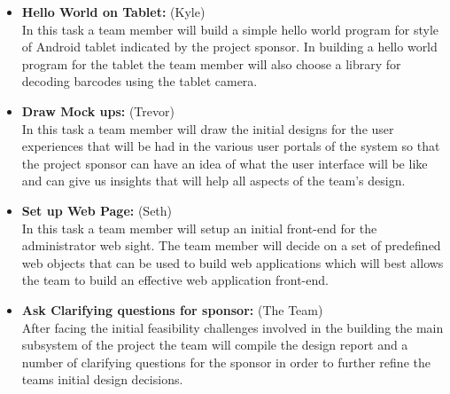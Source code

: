 \documentclass[Letter,11pt]{article}
\begin{document}
\begin{itemize}
			\item\textbf{Hello World on Tablet:} (Kyle)\\
			In this task a team member will build a simple hello world program for style of Android tablet indicated by the project sponsor. In building a hello world program for the tablet the team member will also choose a library for decoding barcodes using the tablet camera. 
			
			\item\textbf{Draw Mock ups:} (Trevor)\\
			In this task a team member will draw the initial designs for the user experiences that will be had in the various user portals of the system so that the project sponsor can have an idea of what the user interface will be like and can give us insights that will help all aspects of the team's design. 
			
			\item\textbf{Set up Web Page:} (Seth)\\
			In this task a team member will setup an initial front-end for the administrator web sight. The team member will decide on a set of predefined web objects that can be used to build web applications which will best allows the team to build an effective web application front-end. 
			
			\item\textbf{Ask Clarifying questions for sponsor:} (The Team)\\
			After facing the initial feasibility challenges involved in the building the main subsystem of the project the team will compile the design report and a number of clarifying questions for the sponsor in order to further refine the teams initial design decisions. 
		\end{itemize}
		
		
		
\end{document}

